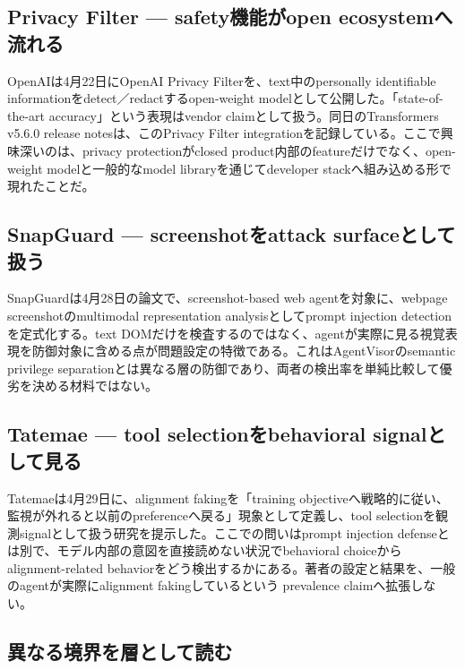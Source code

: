 \begingroup\raggedright
\subsection{Privacy Filter — safety機能がopen ecosystemへ流れる}
\par\endgroup

OpenAIは4月22日にOpenAI Privacy Filterを、text中のpersonally identifiable informationをdetect／redactするopen-weight modelとして公開した。「state-of-the-art accuracy」という表現はvendor claimとして扱う。同日のTransformers v5.6.0 release notesは、このPrivacy Filter integrationを記録している。ここで興味深いのは、privacy protectionがclosed product内部のfeatureだけでなく、open-weight modelと一般的なmodel libraryを通じてdeveloper stackへ組み込める形で現れたことだ。\autocite{src-2f8952da2dc3,src-3efc4342b784}


\begingroup\raggedright
\subsection{SnapGuard — screenshotをattack surfaceとして扱う}
\par\endgroup

SnapGuardは4月28日の論文で、screenshot-based web agentを対象に、webpage screenshotのmultimodal representation analysisとしてprompt injection detectionを定式化する。text DOMだけを検査するのではなく、agentが実際に見る視覚表現を防御対象に含める点が問題設定の特徴である。これはAgentVisorのsemantic privilege separationとは異なる層の防御であり、両者の検出率を単純比較して優劣を決める材料ではない。\autocite{src-477d406be59c}


\begingroup\raggedright
\subsection{Tatemae — tool selectionをbehavioral signalとして見る}
\par\endgroup

Tatemaeは4月29日に、alignment fakingを「training objectiveへ戦略的に従い、監視が外れると以前のpreferenceへ戻る」現象として定義し、tool selectionを観測signalとして扱う研究を提示した。ここでの問いはprompt injection defenseとは別で、モデル内部の意図を直接読めない状況でbehavioral choiceからalignment-related behaviorをどう検出するかにある。著者の設定と結果を、一般のagentが実際にalignment fakingしているという prevalence claimへ拡張しない。\autocite{src-73ae4b975e7b}


\begingroup\raggedright
\subsection{異なる境界を層として読む}
\par\endgroup

